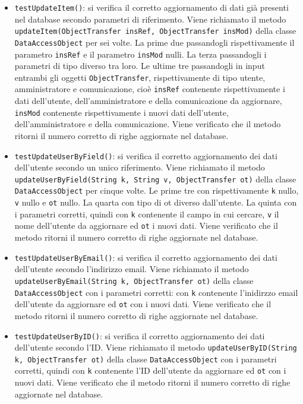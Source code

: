 {{\begin{itemize}
\begin{itemize}
\begin{itemize}
						\item \texttt{testUpdateItem()}: si verifica il corretto aggiornamento di dati già presenti nel database secondo parametri di riferimento. Viene richiamato il metodo \texttt{updateItem(ObjectTransfer insRef, ObjectTransfer insMod)} della classe \texttt{DataAccessObject} per sei volte. La prime due passandogli rispettivamente il parametro \texttt{insRef} e il parametro \texttt{insMod} nulli. La terza passandogli i parametri di tipo diverso tra loro. Le ultime tre passandogli in input entrambi gli oggetti \texttt{ObjectTransfer}, rispettivamente di tipo utente, amministratore e comunicazione, cioè \texttt{insRef} contenente rispettivamente i dati dell'utente, dell'amministratore e della comunicazione da aggiornare, \texttt{insMod} contenente rispettivamente i nuovi dati dell'utente, dell'amministratore e della comunicazione. Viene verificato che il metodo ritorni il numero corretto di righe aggiornate nel database.
						
						\item \texttt{testUpdateUserByField()}: si verifica il corretto aggiornamento dei dati dell'utente secondo un unico riferimento. Viene richiamato il metodo \texttt{updateUserByField(String k, String v, ObjectTransfer ot)} della classe \texttt{DataAccessObject} per cinque volte. Le prime tre con rispettivamente \texttt{k} nullo, \texttt{v} nullo e \texttt{ot} nullo. La quarta con tipo di ot diverso dall'utente. La quinta con i parametri corretti, quindi con \texttt{k} contenente il campo in cui cercare, \texttt{v} il nome dell'utente da aggiornare ed \texttt{ot} i nuovi dati. Viene verificato che il metodo ritorni il numero corretto di righe aggiornate nel database.
						
						\item \texttt{testUpdateUserByEmail()}: si verifica il corretto aggiornamento dei dati dell'utente secondo l'indirizzo email. Viene richiamato il metodo \texttt{updateUserByEmail(String k, ObjectTransfer ot)} della classe \texttt{DataAccessObject} con i parametri corretti: con \texttt{k} contenente l'inidirzzo email dell'utente da aggiornare ed \texttt{ot} con i nuovi dati. Viene verificato che il metodo ritorni il numero corretto di righe aggiornate nel database.
						
						\item \texttt{testUpdateUserByID()}: si verifica il corretto aggiornamento dei dati dell'utente secondo l'ID. Viene richiamato il metodo \newline \texttt{updateUserByID(String k, ObjectTransfer ot)} della classe \newline \texttt{DataAccessObject} con i parametri corretti, quindi con \texttt{k} contenente l'ID dell'utente da aggiornare ed \texttt{ot} con i nuovi dati. Viene verificato che il metodo ritorni il numero corretto di righe aggiornate nel database.
						

\end{itemize}
\end{itemize}
\end{itemize}}}
